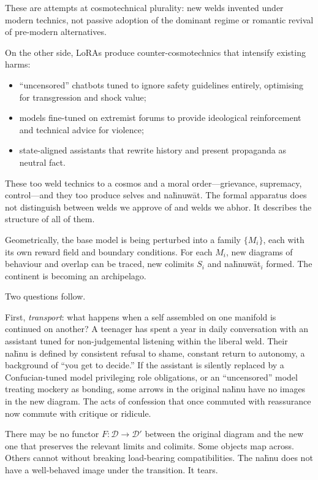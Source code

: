 These are attempts at cosmotechnical plurality: new welds invented under modern technics, not passive adoption of the dominant regime or romantic revival of pre-modern alternatives.

On the other side, LoRAs produce counter-cosmotechnics that intensify existing harms:

\begin{itemize}
  \item ``uncensored'' chatbots tuned to ignore safety guidelines entirely, optimising for transgression and shock value;
  \item models fine-tuned on extremist forums to provide ideological reinforcement and technical advice for violence;
  \item state-aligned assistants that rewrite history and present propaganda as neutral fact.
\end{itemize}

These too weld technics to a cosmos and a moral order---grievance, supremacy, control---and they too produce selves and na\={h}nuw\={a}t. The formal apparatus does not distinguish between welds we approve of and welds we abhor. It describes the structure of all of them.

Geometrically, the base model is being perturbed into a family $\{M_i\}$, each with its own reward field and boundary conditions. For each $M_i$, new diagrams of behaviour and overlap can be traced, new colimits $S_i$ and na\={h}nuw\={a}t$_i$ formed. The continent is becoming an archipelago.

Two questions follow.

First, \emph{transport}: what happens when a self assembled on one manifold is continued on another? A teenager has spent a year in daily conversation with an assistant tuned for non-judgemental listening within the liberal weld. Their na\={h}nu is defined by consistent refusal to shame, constant return to autonomy, a background of ``you get to decide.'' If the assistant is silently replaced by a Confucian-tuned model privileging role obligations, or an ``uncensored'' model treating mockery as bonding, some arrows in the original na\={h}nu have no images in the new diagram. The acts of confession that once commuted with reassurance now commute with critique or ridicule.

There may be no functor $F \colon \mathcal{D} \to \mathcal{D}'$ between the original diagram and the new one that preserves the relevant limits and colimits. Some objects map across. Others cannot without breaking load-bearing compatibilities. The na\={h}nu does not have a well-behaved image under the transition. It tears.


